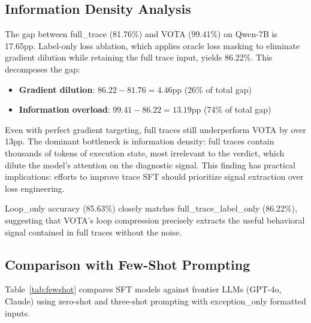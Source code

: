 \documentclass[11pt]{article}
\begin{document}
\subsection{Information Density Analysis}
\label{sec:density}

The gap between full\_trace (81.76\%) and VOTA (99.41\%) on Qwen-7B is 17.65pp. Label-only loss ablation, which applies oracle loss masking to eliminate gradient dilution while retaining the full trace input, yields 86.22\%. This decomposes the gap:

\begin{itemize}
    \item \textbf{Gradient dilution}: $86.22 - 81.76 = 4.46$pp (26\% of total gap)
    \item \textbf{Information overload}: $99.41 - 86.22 = 13.19$pp (74\% of total gap)
\end{itemize}

Even with perfect gradient targeting, full traces still underperform VOTA by over 13pp. The dominant bottleneck is information density: full traces contain thousands of tokens of execution state, most irrelevant to the verdict, which dilute the model's attention on the diagnostic signal. This finding has practical implications: efforts to improve trace SFT should prioritize signal extraction over loss engineering.

Loop\_only accuracy (85.63\%) closely matches full\_trace\_label\_only (86.22\%), suggesting that VOTA's loop compression precisely extracts the useful behavioral signal contained in full traces without the noise.

\subsection{Comparison with Few-Shot Prompting}
\label{sec:fewshot}

Table~\ref{tab:fewshot} compares SFT models against frontier LLMs (GPT-4o, Claude) using zero-shot and three-shot prompting with exception\_only formatted inputs.
\end{document}
